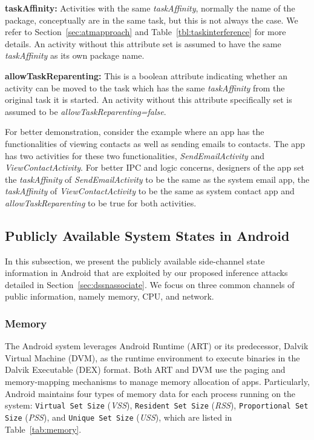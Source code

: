 \documentclass[letterpaper,12pt]{article}
\begin{document}
\textbf{taskAffinity:} Activities with the same \textit{taskAffinity},
normally the name of the package, conceptually are in the same task,
but this is not always the case. We refer to
Section~\ref{sec:atmapproach} and Table~\ref{tbl:taskinterference} for
more details. An activity without this attribute set is assumed to
have the same \textit{taskAffinity} as its own package name.

\textbf{allowTaskReparenting:} This is a boolean attribute indicating
whether an activity can be moved to the task which has the same
\textit{taskAffinity} from the original task it is started. An
activity without this attribute specifically set is assumed to be
\emph{allowTaskReparenting=false}.

For better demonstration, consider the example where an app has the
functionalities of viewing contacts as well as sending emails to
contacts. The app has two activities for these two functionalities,
\textit{SendEmailActivity} and \textit{ViewContactActivity}. For
better IPC and logic concerns, designers of the app set the
\textit{taskAffinity} of \textit{SendEmailActivity} to be the same as
the system email app, the \textit{taskAffinity} of
\textit{ViewContactActivity} to be the same as system contact app and
\textit{allowTaskReparenting} to be true for both activities.

\subsection{Publicly Available System States in Android}
In this subsection, we present the publicly available side-channel state information in Android that are exploited by our proposed inference attacks detailed in Section~\ref{sec:dssnassociate}. We focus on three common channels of public information, namely memory, CPU, and network.

\subsubsection{Memory}
The Android system leverages Android Runtime (ART) or its predecessor, Dalvik Virtual Machine (DVM), as the runtime environment to execute binaries in the Dalvik Executable (DEX) format. Both ART and DVM use the paging and memory-mapping mechanisms \cite{androidmemoverview} to manage memory allocation of apps. Particularly, Android maintains four types of memory data for each process running on the system: \texttt{Virtual Set Size} (\emph{VSS}), \texttt{Resident Set Size} (\emph{RSS}), \texttt{Proportional Set Size} (\emph{PSS}), and \texttt{Unique Set Size} (\emph{USS}), which are listed in Table~\ref{tab:memory}.
\end{document}
